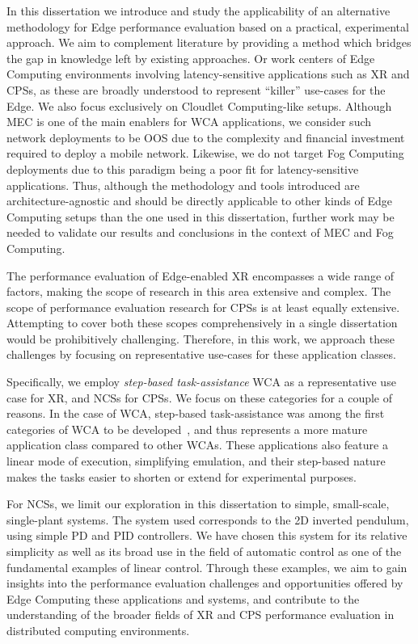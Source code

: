 In this dissertation we introduce and study the applicability of an alternative methodology for Edge performance evaluation based on a practical, experimental approach.
We aim to complement literature by providing a method which bridges the gap in knowledge left by existing approaches.
Or work centers of Edge Computing environments involving latency-sensitive applications such as \gls{XR} and \glspl{CPS}, as these are broadly understood to represent ``killer'' use-cases for the Edge.
We also focus exclusively on Cloudlet Computing-like setups.
Although \gls{MEC} is one of the main enablers for \gls{WCA} applications, we consider such network deployments to be \gls{OOS} due to the complexity and financial investment required to deploy a mobile network.
Likewise, we do not target Fog Computing deployments due to this paradigm being a poor fit for latency-sensitive applications.
Thus, although the methodology and tools introduced are architecture-agnostic and should be directly applicable to other kinds of Edge Computing setups than the one used in this dissertation, further work may be needed to validate our results and conclusions in the context of \gls{MEC} and Fog Computing.

The performance evaluation of Edge-enabled \gls{XR} encompasses a wide range of factors, making the scope of research in this area extensive and complex.
The scope of performance evaluation research for \glspl{CPS} is at least equally extensive.
Attempting to cover both these scopes comprehensively in a single dissertation would be prohibitively challenging.
Therefore, in this work, we approach these challenges by focusing on representative use-cases for these application classes.

Specifically, we employ \emph{step-based task-assistance} \gls{WCA} as a representative use case for \gls{XR}, and \glspl{NCS} for \glspl{CPS}.
We focus on these categories for a couple of reasons.
In the case of \gls{WCA}, step-based task-assistance was among the first categories of \gls{WCA} to be developed~\cite{chen2015early}, and thus represents a more mature application class compared to other \glspl{WCA}.
These applications also feature a linear mode of execution, simplifying emulation, and their step-based nature makes the tasks easier to shorten or extend for experimental purposes.

For \glspl{NCS}, we limit our exploration in this dissertation to simple, small-scale, single-plant systems.
The system used corresponds to the \gls{2D} inverted pendulum, using simple \gls{PD} and \gls{PID} controllers.
We have chosen this system for its relative simplicity as well as its broad use in the field of automatic control as one of the fundamental examples of linear control.
Through these examples, we aim to gain insights into the performance evaluation challenges and opportunities offered by Edge Computing these applications and systems, and contribute to the understanding of the broader fields of \gls{XR} and \gls{CPS} performance evaluation in distributed computing environments.

